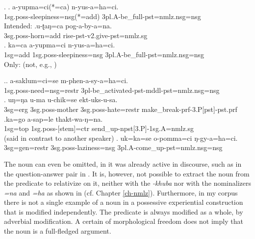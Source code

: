 \ex. \ag. a-yupma=ci(*=ca) n-yus-a=ha=ci.\\
	{\sc 1sg.poss}-sleepiness{\sc =nsg(*=add)} {\sc 3pl.A}-be\_full{\sc -pst=nmlz.nsg=nsg}\\
	Intended:  
	\bg.u-ʈaŋ=ca pog-a-by-a=na.\\
	{\sc 3sg.poss-}horn{\sc =add} rise{\sc [3sg]-pst-v2.give-pst=nmlz.sg}\\
	\bg. ka=ca a-yupma=ci n-yus-a=ha=ci.\label{kacaayupma}\\
	{\sc 1sg=add} {\sc 1sg.poss}-sleepiness{\sc =nsg} {\sc 3pl.A}-be\_full{\sc -pst=nmlz.nsg=nsg}\\
	Only:   (not, e.g., )
	

\ex.\ag. a-saklum=ci=se m-phen-a-sy-a=ha=ci.\\
{\sc 1sg.poss}-need{\sc =nsg=restr} {\sc 3pl}-be\_activated-{\sc pst-mddl-pst=nmlz.nsg=nsg}	\\
\bg. uŋ=ŋa   u-ma             u-chik=se  ekt-uks-u-sa.\\
{\sc 3sg=erg} {\sc 3sg.poss-}mother {\sc 3sg.poss-}hate{\sc =restr} make\_break{\sc -prf-3.P[pst]-pst.prf}\\
\bg.ka=go a-sap=le thakt-wa-ŋ=na.\\
{\sc 1sg=top} {\sc 1sg.poss-}[stem]{\sc =ctr} send\_up{\sc -npst[3.P]-1sg.A=nmlz.sg}\\
 (said in contrast to another speaker)
\bg.  uk=ka=se  o-pomma=ci ŋ-gy-a=ha=ci.\label{ukkaseopomma}\\
{\sc 3sg=gen=restr} {\sc 3sg.poss-}laziness{\sc =nsg} {\sc 3pl.A}-come\_up{\sc -pst=nmlz.nsg=nsg}\\


The noun can even be omitted, in  it was already active in discourse, such as in the question-answer pair in \Next. It is, however, not possible to extract the noun from the predicate to relativize on it, neither with the  \emph{-khuba} nor with the  nominalizers \emph{=na} and \emph{=ha} as shown in \NNext (cf. Chapter \ref{ch-nmlz}).  Furthermore, in my corpus there is not a single example of a noun in a possessive experiential construction that is modified independently. The predicate is always modified as a whole, by adverbial modification. A certain  of  morphological freedom does not imply that the noun is a full-fledged argument.


